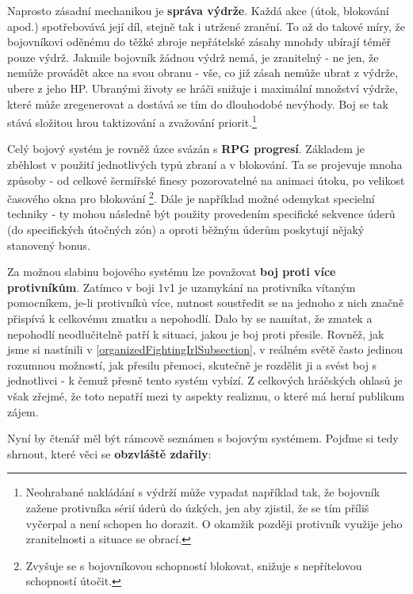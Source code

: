 Naprosto zásadní mechanikou je \textbf{správa výdrže}. Každá akce (útok, blokování apod.) spotřebovává její díl, stejně tak i utržené zranění. To až do takové míry, že bojovníkovi oděnému do těžké zbroje nepřátelské zásahy mnohdy ubírají téměř pouze výdrž. Jakmile bojovník žádnou výdrž nemá, je zranitelný - ne jen, že nemůže provádět akce na svou obranu - vše, co již zásah nemůže ubrat z výdrže, ubere z jeho \acs{HP}. Ubranými životy se hráči snižuje i maximální množství výdrže, které může zregenerovat a dostává se tím do dlouhodobé nevýhody. Boj se tak stává složitou hrou taktizování a zvažování priorit.\footnote{Neohrabané nakládání s výdrží může vypadat například tak, že bojovník zažene protivníka sérií úderů do úzkých, jen aby zjistil, že se tím příliš vyčerpal a není schopen ho dorazit. O okamžik později protivník využije jeho zranitelnosti a situace se obrací.}  

Celý bojový systém je rovněž úzce svázán s \textbf{\acs{RPG} progresí}. Základem je zběhlost v použití jednotlivých typů zbraní a v blokování. Ta se projevuje mnoha způsoby - od celkové šermířské finesy pozorovatelné na animaci útoku, po velikost časového okna pro blokování \footnote{Zvyšuje se s bojovníkovou schopností blokovat, snižuje s nepřítelovou schopností útočit.}. Dále je například možné odemykat specielní techniky - ty mohou následně být použity provedením specifické sekvence úderů (do specifických útočných zón) a oproti běžným úderům poskytují nějaký stanovený bonus.

Za možnou slabinu bojového systému lze považovat \textbf{boj proti více protivníkům}. Zatímco v boji 1v1 je uzamykání na protivníka vítaným pomocníkem, je-li protivníků více, nutnost soustředit se na jednoho z nich značně přispívá k celkovému zmatku a nepohodlí. Dalo by se namítat, že zmatek a nepohodlí neodlučitelně patří k situaci, jakou je boj proti přesile. Rovněž, jak jsme si nastínili v \ref{organizedFightingIrlSubsection}, v reálném světě často jedinou rozumnou možností, jak přesilu přemoci, skutečně je rozdělit ji a svést boj s jednotlivci - k čemuž přesně tento systém vybízí. Z celkových hráčských ohlasů je však zřejmé, že toto nepatří mezi ty aspekty realizmu, o které má herní publikum zájem.

\pagebreak

Nyní by čtenář měl být rámcově seznámen s bojovým systémem. Pojďme si tedy shrnout, které věci se \textbf{obzvláště zdařily}:

